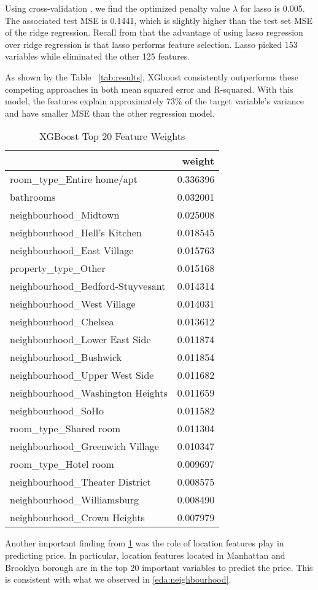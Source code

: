 Using cross-validation , we find the optimized penalty value $\lambda$ for lasso
is 0.005.  The associated test MSE is 0.1441, which is slightly higher than the
test set MSE of the ridge regression.  Recall from that the advantage of using
lasso regression over ridge regression is that lasso performs feature selection.
Lasso picked 153 variables while eliminated the other 125 features.


As shown by the Table ~\ref{tab:results}, XGboost consistently outperforms these
competing approaches in both mean squared error and R-squared.  With this model,
the features explain approximately 73\% of the target variable's variance and
have smaller MSE than the other regression model.

\begin{table}[!htbp]
  \centering
  \caption{XGBoost Top 20 Feature Weights}
  \label{tab:xgb-weights}
  \begin{tabular}{lr}
    \toprule
    {} &    weight \\
    \midrule
    room\_type\_Entire home/apt        &  0.336396 \\
    bathrooms                        &  0.032001 \\
    neighbourhood\_Midtown            &  0.025008 \\
    neighbourhood\_Hell's Kitchen     &  0.018545 \\
    neighbourhood\_East Village       &  0.015763 \\
    property\_type\_Other              &  0.015168 \\
    neighbourhood\_Bedford-Stuyvesant &  0.014314 \\
    neighbourhood\_West Village       &  0.014031 \\
    neighbourhood\_Chelsea            &  0.013612 \\
    neighbourhood\_Lower East Side    &  0.011874 \\
    neighbourhood\_Bushwick           &  0.011854 \\
    neighbourhood\_Upper West Side    &  0.011682 \\
    neighbourhood\_Washington Heights &  0.011659 \\
    neighbourhood\_SoHo               &  0.011582 \\
    room\_type\_Shared room            &  0.011304 \\
    neighbourhood\_Greenwich Village  &  0.010347 \\
    room\_type\_Hotel room             &  0.009697 \\
    neighbourhood\_Theater District   &  0.008575 \\
    neighbourhood\_Williamsburg       &  0.008490 \\
    neighbourhood\_Crown Heights      &  0.007979 \\
  \bottomrule
  \end{tabular}
\end{table}

Another important finding from \ref{tab:xgb-weights} was the role of location
features play in predicting price. In particular, location features located in
Manhattan and Brooklyn borough are in the top 20 important variables to predict
the price. This is consistent with what we observed in \ref{eda:neighbourhood}.
